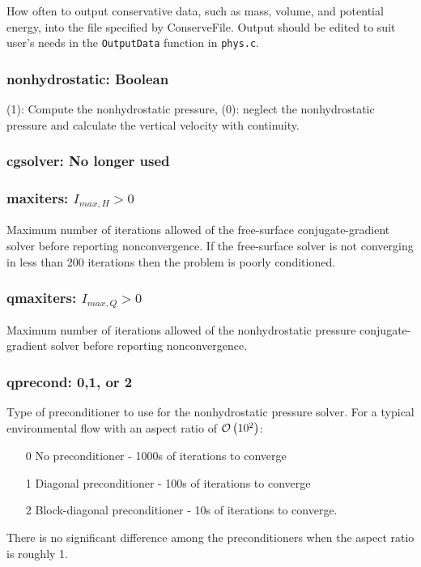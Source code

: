 How often to output conservative data, such as mass, volume, and potential energy, into
the file specified by ConserveFile.  Output should be edited to suit user's needs in
the \verb+OutputData+ function in \verb+phys.c+.

\subsubsection{nonhydrostatic: Boolean}

(1): Compute the nonhydrostatic pressure, (0): neglect the nonhydrostatic pressure and
calculate the vertical velocity with continuity.

\subsubsection{cgsolver: No longer used}

\subsubsection{maxiters: $I_{max,H}>0$}

Maximum number of iterations allowed of the free-surface conjugate-gradient solver before
reporting nonconvergence.  If the free-surface solver is not converging in less than 200
iterations then the problem is poorly conditioned.

\subsubsection{qmaxiters: $I_{max,Q}>0$}

Maximum number of iterations allowed of the nonhydrostatic pressure conjugate-gradient solver before
reporting nonconvergence. 

\subsubsection{qprecond: 0,1, or 2}

Type of preconditioner to use for the nonhydrostatic pressure solver.  For a typical environmental
flow with an aspect ratio of $\mathcal{O}\left(10^2\right)$:
\begin{enumerate}
\item[0] No preconditioner - 1000s of iterations to converge
\item[1] Diagonal preconditioner - 100s of iterations to converge
\item[2] Block-diagonal preconditioner - 10s of iterations to converge.
\end{enumerate}
There is no significant difference among the preconditioners when the aspect ratio is roughly 1.

